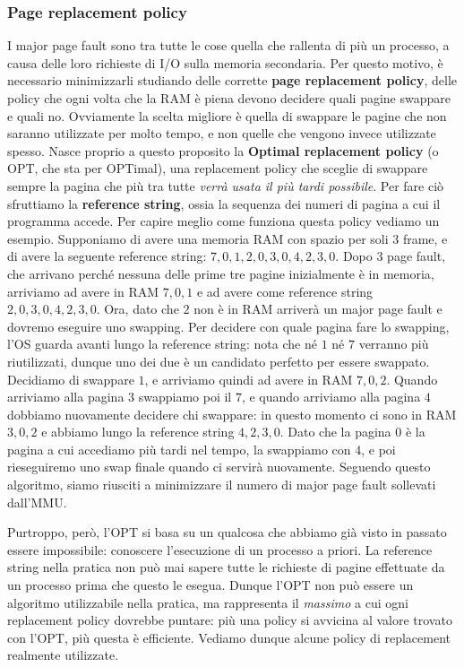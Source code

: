 \documentclass[11pt, a4paper, titlepage, oneside]{scrbook}
\begin{document}
\subsubsection*{Page replacement policy}

I major page fault sono tra tutte le cose quella che rallenta di più un processo, a causa delle loro richieste di I/O sulla memoria secondaria. Per questo motivo, è necessario minimizzarli studiando delle corrette \textbf{page replacement policy}, delle policy che ogni volta che la RAM è piena devono decidere quali pagine swappare e quali no. Ovviamente la scelta migliore è quella di swappare le pagine che non saranno utilizzate per molto tempo, e non quelle che vengono invece utilizzate spesso. Nasce proprio a questo proposito la \textbf{Optimal replacement policy} (o OPT, che sta per OPTimal), una replacement policy che sceglie di swappare sempre la pagina che più tra tutte \textit{verrà usata il più tardi possibile}. Per fare ciò sfruttiamo la \textbf{reference string}, ossia la sequenza dei numeri di pagina a cui il programma accede. Per capire meglio come funziona questa policy vediamo un esempio. Supponiamo di avere una memoria RAM con spazio per soli 3 frame, e di avere la seguente reference string: $7,0,1,2,0,3,0,4,2,3,0$. Dopo 3 page fault, che arrivano perché nessuna delle prime tre pagine inizialmente è in memoria, arriviamo ad avere in RAM $7,0,1$ e ad avere come reference string $2,0,3,0,4,2,3,0$. Ora, dato che $2$ non è in RAM arriverà un major page fault e dovremo eseguire uno swapping. Per decidere con quale pagina fare lo swapping, l'OS guarda avanti lungo la reference string: nota che né $1$ né $7$ verranno più riutilizzati, dunque uno dei due è un candidato perfetto per essere swappato. Decidiamo di swappare $1$, e arriviamo quindi ad avere in RAM $7,0,2$. Quando arriviamo alla pagina $3$ swappiamo poi il $7$, e quando arriviamo alla pagina $4$ dobbiamo nuovamente decidere chi swappare: in questo momento ci sono in RAM $3,0,2$ e abbiamo lungo la reference string $4,2,3,0$. Dato che la pagina $0$ è la pagina a cui accediamo più tardi nel tempo, la swappiamo con $4$, e poi rieseguiremo uno swap finale quando ci servirà nuovamente. Seguendo questo algoritmo, siamo riusciti a minimizzare il numero di major page fault sollevati dall'MMU.

Purtroppo, però, l'OPT si basa su un qualcosa che abbiamo già visto in passato essere impossibile: conoscere l'esecuzione di un processo a priori. La reference string nella pratica non può mai sapere tutte le richieste di pagine effettuate da un processo prima che questo le esegua. Dunque l'OPT non può essere un algoritmo utilizzabile nella pratica, ma rappresenta il \textit{massimo} a cui ogni replacement policy dovrebbe puntare: più una policy si avvicina al valore trovato con l'OPT, più questa è efficiente. Vediamo dunque alcune policy di replacement realmente utilizzate.
\end{document}
